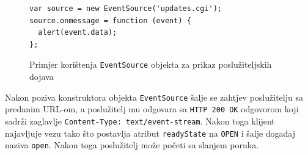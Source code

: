 \documentclass[times, utf8, zavrsni]{fer}
\begin{document}
\begin{figure}
\begin{lstlisting}
var source = new EventSource('updates.cgi');
source.onmessage = function (event) {
  alert(event.data);
};
\end{lstlisting}
\caption{Primjer korištenja {\tt EventSource} objekta za prikaz poslužiteljskih dojava}
\label{lst:eventsource}
\end{figure}

Nakon poziva konstruktora objekta {\tt EventSource} šalje se zahtjev poslužitelju sa predanim URL-om, a poslužitelj mu odgovara sa {\tt HTTP 200 OK} odgovorom koji sadrži zaglavlje {\tt Content-Type: text/event-stream}. Nakon toga klijent najavljuje vezu tako što postavlja atribut {\tt readyState} na {\tt OPEN} i šalje događaj naziva {\tt open}. Nakon toga poslužitelj može početi sa slanjem poruka.
\end{document}
